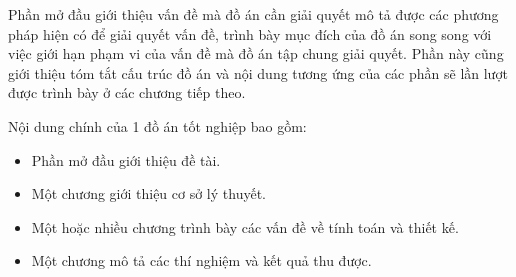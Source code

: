 \setcounter{section}{1}
Phần mở đầu giới thiệu vấn đề mà đồ án cần giải quyết mô tả được các phương pháp hiện có để giải quyết vấn đề, trình bày mục đích của đồ án song song với việc giới hạn phạm vi của vấn đề mà đồ án tập chung giải quyết. Phần này cũng giới thiệu tóm tắt cấu trúc đồ án và nội dung tương ứng của các phần sẽ lần lượt được trình bày ở các chương tiếp theo.

Nội dung chính của 1 đồ án tốt nghiệp bao gồm:
\begin{itemize}
    \item Phần mở đầu giới thiệu đề tài.
    \item Một chương giới thiệu cơ sở lý thuyết.
    \item Một hoặc nhiều chương trình bày các vấn đề về tính toán và thiết kế.
    \item Một chương mô tả các thí nghiệm và kết quả thu được.
\end{itemize}


\cleardoublepage